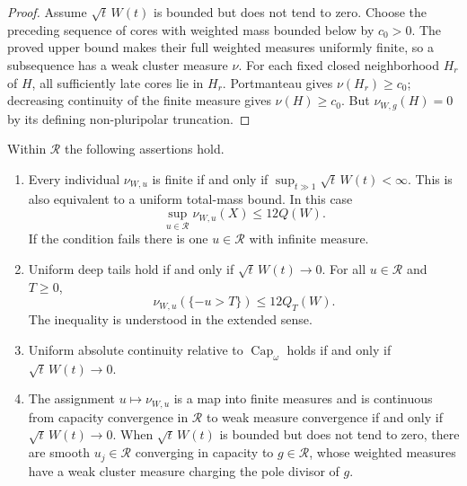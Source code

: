 \begin{proof}
Assume $\sqrt t\,W(t)$ is bounded but does not tend to zero. Choose
the preceding sequence of cores with weighted mass bounded below by
$c_0>0$. The proved upper bound makes their full weighted measures
uniformly finite, so a subsequence has a weak cluster measure $\nu$.
For each fixed closed neighborhood $H_r$ of $H$, all sufficiently late
cores lie in $H_r$. Portmanteau gives $\nu(H_r)\geq c_0$; decreasing
continuity of the finite measure gives $\nu(H)\geq c_0$.
But $\nu_{W,g}(H)=0$ by its defining non-pluripolar truncation.
\end{proof}

\begin{theorem}\label{thm:rotational-sharp-damping}
Within $\mathcal R$ the following assertions hold.
\begin{enumerate}
\item Every individual $\nu_{W,u}$ is finite if and only if
$\sup_{t\gg1}\sqrt t\,W(t)<\infty$. This is also equivalent to a uniform
total-mass bound. In this case
\[
 \sup_{u\in\mathcal R}\nu_{W,u}(X)\leq12Q(W).
\]
If the condition fails there is one $u\in\mathcal R$ with infinite measure.
\item Uniform deep tails hold if and only if $\sqrt t\,W(t)\to0$.
For all $u\in\mathcal R$ and $T\geq0$,
\[
 \nu_{W,u}(\{-u>T\})\leq12Q_T(W).
\]
The inequality is understood in the extended sense.
\item Uniform absolute continuity relative to $\operatorname{Cap}_\omega$
holds if and only if $\sqrt t\,W(t)\to0$.
\item The assignment $u\mapsto\nu_{W,u}$ is a map into finite measures
and is continuous from capacity convergence in $\mathcal R$ to weak
measure convergence if and only if $\sqrt t\,W(t)\to0$.
When $\sqrt t\,W(t)$ is bounded but does not tend to zero, there are
smooth $u_j\in\mathcal R$ converging in capacity to
$g\in\mathcal R$, whose weighted measures have a weak cluster measure
charging the pole divisor of $g$.
\end{enumerate}
\end{theorem}
